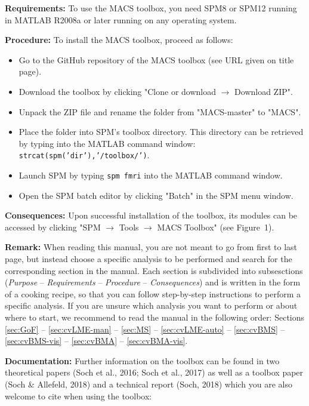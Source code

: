 \documentclass[a4paper,12pt]{article}
\newcommand{\ra}{$\rightarrow$ }
\begin{document}
\textbf{Requirements:} To use the MACS toolbox, you need SPM8 or SPM12 running in \linebreak[4] MATLAB R2008a or later running on any operating system.

\textbf{Procedure:} To install the MACS toolbox, proceed as follows:
\begin{itemize}
	
\item
Go to the GitHub repository of the MACS toolbox (see URL given on title page).

\item
Download the toolbox by clicking "Clone or download \ra Download ZIP".

\item
Unpack the ZIP file and rename the folder from "MACS-master" to "MACS".

\item
Place the folder into SPM's toolbox directory. This directory can be retrieved by typing into the MATLAB command window: \texttt{strcat(spm('dir'),'/toolbox/')}.

\item
Launch SPM by typing \texttt{spm fmri} into the MATLAB command window.

\item
Open the SPM batch editor by clicking "Batch" in the SPM menu window.

\end{itemize}

\textbf{Consequences:} Upon successful installation of the toolbox, its modules can be accessed by clicking "SPM \ra Tools \ra MACS Toolbox" (see Figure~1).

\textbf{Remark:} When reading this manual, you are not meant to go from first to last page, but instead choose a specific analysis to be performed and search for the corresponding section in the manual. Each section is subdivided into subsesctions (\textit{Purpose} -- \textit{Requirements} -- \textit{Procedure} -- \textit{Consequences}) and is written in the form of a cooking recipe, so that you can follow step-by-step instructions to perform a specific analysis. If you are unsure which analysis you want to perform or about where to start, we recommend to read the manual in the following order: Sections \ref{sec:GoF} -- \ref{sec:cvLME-man} -- \ref{sec:MS} -- \ref{sec:cvLME-auto} -- \ref{sec:cvBMS} -- \ref{sec:cvBMS-vis} -- \ref{sec:cvBMA} -- \ref{sec:cvBMA-vis}.

\pagebreak
\textbf{Documentation:} Further information on the toolbox can be found in two theoretical papers (Soch et al., 2016; Soch et al., 2017) as well as a toolbox paper (Soch \& Allefeld, 2018) and a technical report (Soch, 2018) which you are also welcome to cite when using the toolbox:
\end{document}
